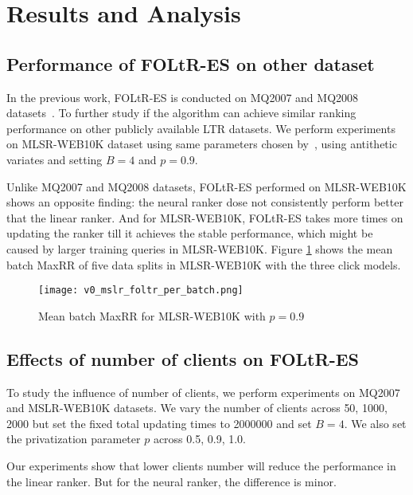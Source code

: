 \section{Results and Analysis}



\subsection{Performance of FOLtR-ES on other dataset}

In the previous work, FOLtR-ES is conducted on MQ2007 and MQ2008 datasets~\cite{kharitonov2019federated}. To further study if the algorithm can achieve similar ranking performance on other publicly available LTR datasets. We perform experiments on MLSR-WEB10K dataset using same parameters chosen by~\cite{kharitonov2019federated}, using antithetic variates and setting $B = 4$ and $p = 0.9$. 

Unlike MQ2007 and MQ2008 datasets, FOLtR-ES performed on MLSR-WEB10K shows an opposite finding: the neural ranker dose not consistently perform better that the linear ranker. And for MLSR-WEB10K, FOLtR-ES takes more times on updating the ranker till it achieves the stable performance, which might be caused by larger training queries in MLSR-WEB10K. Figure \ref{fig: mslr-v0} shows the mean batch MaxRR of five data splits in MLSR-WEB10K with the three click models.

\begin{figure}[H]
	\centering
	\texttt{[image: v0\_mslr\_foltr\_per\_batch.png]}
	\caption{Mean batch MaxRR for MLSR-WEB10K with $p = 0.9$}
	\label{fig: mslr-v0}
\end{figure}


\subsection{Effects of number of clients on FOLtR-ES}

To study the influence of number of clients, we perform experiments on MQ2007 and MSLR-WEB10K datasets. We vary the number of clients across {50, 1000, 2000} but set the fixed total updating times to 2000000 and set $B = 4$. We also set the privatization parameter $p$ across {0.5, 0.9, 1.0}.

Our experiments show that lower clients number will reduce the performance in the linear ranker. But for the neural ranker, the difference is minor.

